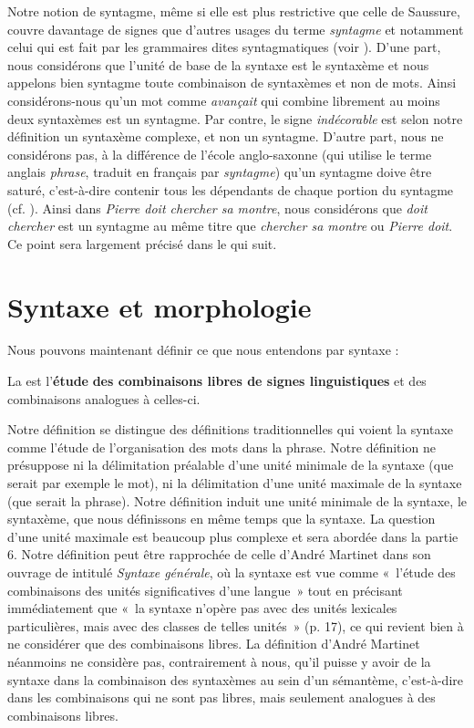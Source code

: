 {    Notre notion de syntagme, même si elle est plus restrictive que celle de Saussure, couvre davantage de signes que d’autres usages du terme \textit{syntagme} et notamment celui qui est fait par les grammaires dites syntagmatiques (voir ). D’une part, nous considérons que l’unité de base de la syntaxe est le syntaxème et nous appelons bien syntagme toute combinaison de syntaxèmes et non de mots. Ainsi considérons-nous qu’un mot comme \textit{avançait} qui combine librement au moins deux syntaxèmes est un syntagme. Par contre, le signe \textit{indécorable} est selon notre définition un syntaxème complexe, et non un syntagme. D’autre part, nous ne considérons pas, à la différence de l’école anglo-saxonne (qui utilise le terme anglais \textit{phrase}, traduit en français par \textit{syntagme}) qu’un syntagme doive être saturé, c’est-à-dire contenir tous les dépendants de chaque portion du syntagme (cf. ). Ainsi dans \textit{Pierre doit chercher sa montre}, nous considérons que \textit{doit chercher} est un syntagme au même titre que \textit{chercher sa montre} ou \textit{Pierre doit}. Ce point sera largement précisé dans le  qui suit.
}
\section{Syntaxe et morphologie}\label{sec:3.1.6}

Nous pouvons maintenant définir ce que nous entendons par syntaxe :

{La  est l'\textbf{étude} \textbf{des combinaisons libres de signes linguistiques} et des combinaisons analogues à celles-ci.}

Notre définition se distingue des définitions traditionnelles qui voient la syntaxe comme l’étude de l’organisation des mots dans la phrase. Notre définition ne présuppose ni la délimitation préalable d’une unité minimale de la syntaxe (que serait par exemple le mot), ni la délimitation d’une unité maximale de la syntaxe (que serait la phrase). Notre définition induit une unité minimale de la syntaxe, le syntaxème, que nous définissons en même temps que la syntaxe. La question d’une unité maximale est beaucoup plus complexe et sera abordée dans la partie 6. Notre définition peut être rapprochée de celle d’André Martinet dans son ouvrage de \citeyear{martinet1985syntaxe} intitulé \textit{Syntaxe générale}, où la syntaxe est vue comme «~l’étude des combinaisons des unités significatives d’une langue~» tout en précisant immédiatement que «~la syntaxe n’opère pas avec des unités lexicales particulières, mais avec des classes de telles unités~» (p. 17), ce qui revient bien à ne considérer que des combinaisons libres. La définition d’André Martinet néanmoins ne considère pas, contrairement à nous, qu’il puisse y avoir de la syntaxe dans la combinaison des syntaxèmes au sein d’un sémantème, c’est-à-dire dans les combinaisons qui ne sont pas libres, mais seulement analogues à des combinaisons libres.


